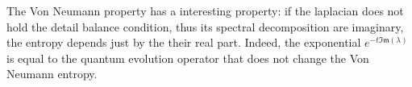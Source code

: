 

The Von Neumann property has a interesting property: if the laplacian does not hold the detail balance condition, thus its spectral decomposition are imaginary, the entropy depends just by the their real part. Indeed, the exponential $e^{-t\mathfrak{Im}(\lambda)}$ is equal to the quantum evolution operator that does not change the Von Neumann entropy.
